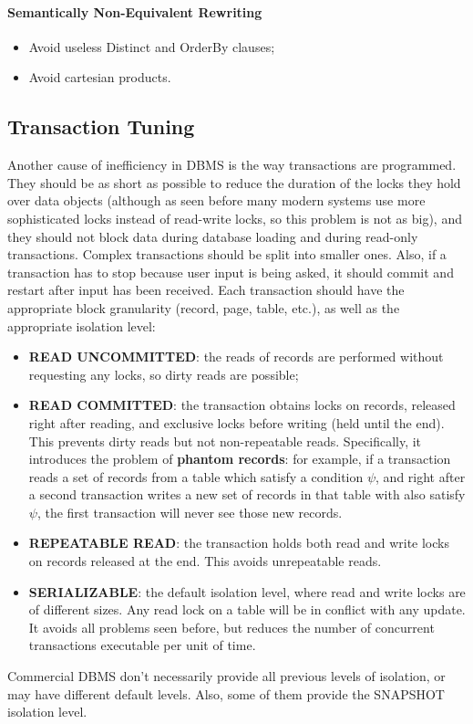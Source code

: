 \paragraph{Semantically Non-Equivalent Rewriting}
\begin{itemize}
    \item Avoid useless Distinct and OrderBy clauses;
    
    \item Avoid cartesian products.
\end{itemize}

\subsection{Transaction Tuning}

Another cause of inefficiency in DBMS is the way transactions are programmed. They should be as short as possible to reduce the duration of the locks they hold over data objects (although as seen before many modern systems use more sophisticated locks instead of read-write locks, so this problem is not as big), and they should not block data during database loading and during read-only transactions. Complex transactions should be split into smaller ones. Also, if a transaction has to stop because user input is being asked, it should commit and restart after input has been received. Each transaction should have the appropriate block granularity (record, page, table, etc.), as well as the appropriate isolation level:
\begin{itemize}
    \item \textbf{READ UNCOMMITTED}: the reads of records are performed without requesting any locks, so dirty reads are possible;

    \item \textbf{READ COMMITTED}: the transaction obtains locks on records, released right after reading, and exclusive locks before writing (held until the end). This prevents dirty reads but not non-repeatable reads. Specifically, it introduces the problem of \textbf{phantom records}: for example, if a transaction reads a set of records from a table which satisfy a condition $\psi$, and right after a second transaction writes a new set of records in that table with also satisfy $\psi$, the first transaction will never see those new records.

    \item \textbf{REPEATABLE READ}: the transaction holds both read and write locks on records released at the end. This avoids unrepeatable reads.

    \item \textbf{SERIALIZABLE}: the default isolation level, where read and write locks are of different sizes. Any read lock on a table will be in conflict with any update. It avoids all problems seen before, but reduces the number of concurrent transactions executable per unit of time.
\end{itemize}
Commercial DBMS don't necessarily provide all previous levels of isolation, or may have different default levels. Also, some of them provide the SNAPSHOT isolation level.

